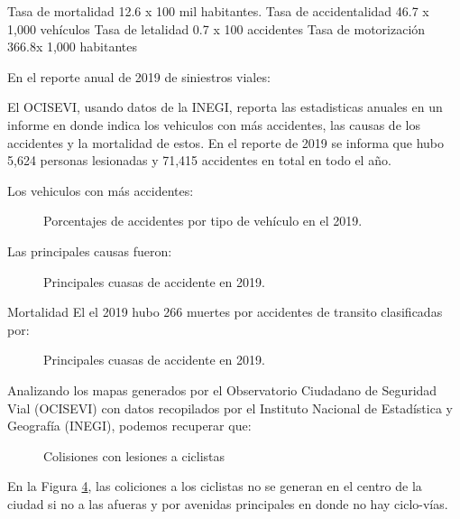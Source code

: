 \documentclass[a4paper]{article}
\begin{document}
Tasa de mortalidad 12.6 x 100 mil habitantes.
Tasa de accidentalidad 46.7 x 1,000 vehículos
Tasa de letalidad 0.7 x 100 accidentes
Tasa de motorización 366.8x 1,000 habitantes
\autocite{Perfil}

En el reporte anual de 2019 de siniestros viales: 

El OCISEVI, usando datos de la INEGI, reporta las estadisticas anuales en un informe en donde indica los vehiculos con más accidentes, las causas de los accidentes y la mortalidad de estos. En el reporte de 2019 se informa que hubo 5,624 personas lesionadas y  71,415 accidentes en total en todo el año.


Los vehiculos con más accidentes:

\begin{figure}[H]
    \centering

    \caption{Porcentajes de accidentes por tipo de vehículo en el 2019. \autocite{OCISEVI}}
    \label{fig:pie3}
\end{figure}

Las principales causas fueron:

\begin{figure}[H]
    \centering

    \caption{Principales cuasas de accidente en 2019. \autocite{OCISEVI}}
    \label{fig:pie2}
\end{figure}

Mortalidad 
El el 2019 hubo 266 muertes por accidentes de transito clasificadas por:

\begin{figure}[H]
    \centering

    \caption{Principales cuasas de accidente en 2019. \autocite{OCISEVI}}
    \label{fig:pie4}
\end{figure}

Analizando los mapas generados por el Observatorio Ciudadano de Seguridad Vial (OCISEVI) con datos recopilados por el Instituto  Nacional  de Estadística  y  Geografía (INEGI), podemos recuperar que:

\begin{figure}[H]
    \centering

    \caption{Colisiones con lesiones a ciclistas\\\autocite{DatosInegi}}
    \label{fig:Mapa1}
\end{figure}
En la Figura \ref{fig:Mapa1}, las coliciones a los ciclistas no se generan en el centro de la ciudad si no a las afueras y por avenidas principales en donde no hay ciclo-vías.
\end{document}
